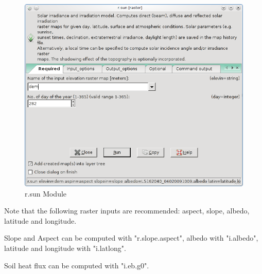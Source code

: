\begin{figure}[htbp]
   \centering
   \includegraphics[scale=0.4]{gipe020.png}
   \caption{r.sun Module}
   \label{fig:gipe020}
\end{figure}

Note that the following raster inputs are recommended: aspect, slope, albedo, latitude and longitude.\newline

Slope and Aspect can be computed with "r.slope.aspect", albedo with "i.albedo", latitude and longitude with "i.latlong".\newline

Soil heat flux can be computed with "i.eb.g0".\newline

